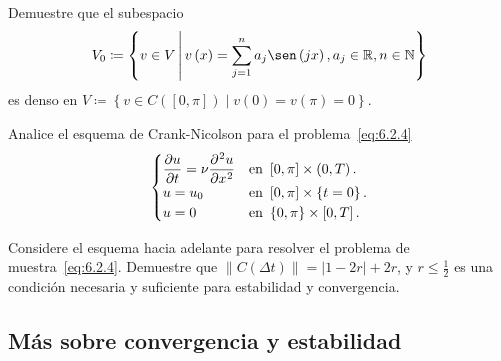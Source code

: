 \begin{questions}
	\question

	Demuestre que el subespacio
	\vspace*{-.5\baselineskip}\setlength\belowdisplayshortskip{0pt}
	\begin{equation*}
		V_{0}\coloneqq
		\left\{
		v\in V \,\middle\vert\,
		v\left(x\right)=
		\sum_{j=1}^{n}a_{j}\sen\left(jx\right),
		a_{j}\in\mathbb{R},
		n\in\mathbb{N}
		\right\}
	\end{equation*}
	es denso en
	\begin{math}
		V\coloneqq
		\left\{
		v\in C\left(\left[0,\pi\right]\right)\mid
		v\left(0\right)=
		v\left(\pi\right)=0
		\right\}
	\end{math}.

	\question

	Analice el esquema de Crank-Nicolson para el problema~\eqref{eq:6.2.4}
	\begin{equation}\label{eq:6.2.4}
		\begin{cases}\displaystyle
			\diffp{u}{t}=
			\nu
			\diffp[2]{u}{x} &
			\text{en }\left[0,\pi\right]\times\left(0,T\right).   \\
			u=u_{0}         &
			\text{en }\left[0,\pi\right]\times\left\{t=0\right\}. \\
			u=0             &
			\text{en }\left\{0,\pi\right\}\times\left[0,T\right].
		\end{cases}
	\end{equation}

	\question

	Considere el esquema hacia adelante para resolver el problema de
	muestra~\eqref{eq:6.2.4}.
	Demuestre que $\left\|C\left(\Delta t\right)\right\|=\left|1-2r\right|+2r$,
	y $r\leq\frac{1}{2}$ es una condición necesaria y suficiente para
	estabilidad y convergencia.
\end{questions}

\subsection*{Más sobre convergencia y estabilidad}


